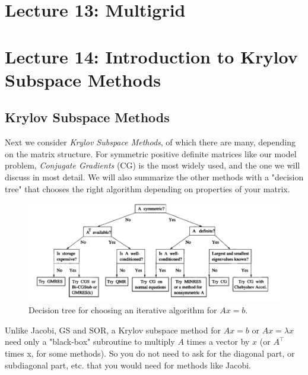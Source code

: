 \documentclass[11pt]{article}
\numberwithin{equation}{section}
\begin{document}
\newpage
\section{Lecture 13: Multigrid}

\newpage
\section{Lecture 14: Introduction to Krylov Subspace Methods}
\subsection{Krylov Subspace Methods}
Next we consider \textit{Krylov Subspace Methods}, of which there are many, depending on the matrix structure. 
For symmetric positive definite matrices like our model problem, \textit{Conjugate Gradients} (CG) is the most widely used, 
and the one we will discuss in most detail.  We will also summarize the other methods with a "decision tree" that chooses the right
algorithm depending on properties of your matrix.

\begin{figure}[h]
    \centering
    \includegraphics[width=14cm]{images/lec14-1.png}
    \caption{Decision tree for choosing an iterative algorithm for $Ax = b$.}
\end{figure}

Unlike Jacobi, GS and SOR, a Krylov subspace method for $Ax=b$ or $Ax = \lambda x$ need only a "black-box" subroutine to multiply $A$ times a vector by $x$ 
(or $A^\top$ times x, for some methods). So you do not need to ask for the diagonal part, or subdiagonal part, etc. that you would need for methods like Jacobi.
\end{document}
